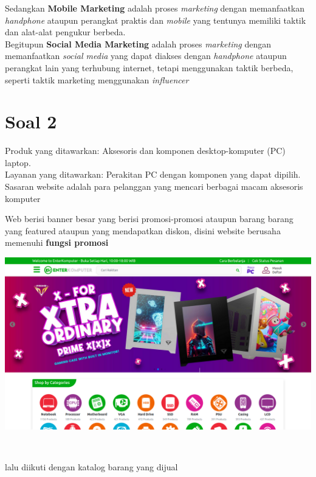 \documentclass{article}
\begin{document}
\noindent Sedangkan \textbf{Mobile Marketing} adalah proses \emph{marketing} dengan memanfaatkan \emph{handphone} ataupun perangkat praktis dan  \emph{mobile} yang tentunya memiliki taktik dan alat-alat pengukur berbeda.\\

\noindent Begitupun \textbf{Social Media Marketing} adalah proses \emph{marketing} dengan memanfaatkan \emph{social media} yang dapat diakses dengan \emph{handphone} ataupun perangkat lain yang terhubung internet, tetapi menggunakan taktik berbeda, seperti taktik marketing menggunakan \emph{influencer}\\


\section*{Soal 2}
Produk yang ditawarkan: Aksesoris dan komponen 
desktop-komputer (PC) laptop. \\
Layanan yang ditawarkan: Perakitan PC dengan komponen yang dapat dipilih.
Sasaran website adalah para pelanggan yang mencari berbagai macam aksesoris komputer
\smallbreak\noindent
\begin{minipage}{0.30\textwidth}
    Web berisi banner besar yang berisi promosi-promosi ataupun barang barang yang featured ataupun yang mendapatkan diskon,
    disini website berusaha memenuhi \textbf{fungsi promosi}
\end{minipage}
\hspace*{0.04\textwidth}
\begin{minipage}{0.65\textwidth}
    \includegraphics[width=\textwidth]{file-34.png}
\end{minipage}
\\
\begin{minipage}{0.30\textwidth}
    lalu diikuti dengan katalog barang yang dijual
\end{minipage}
\end{document}
